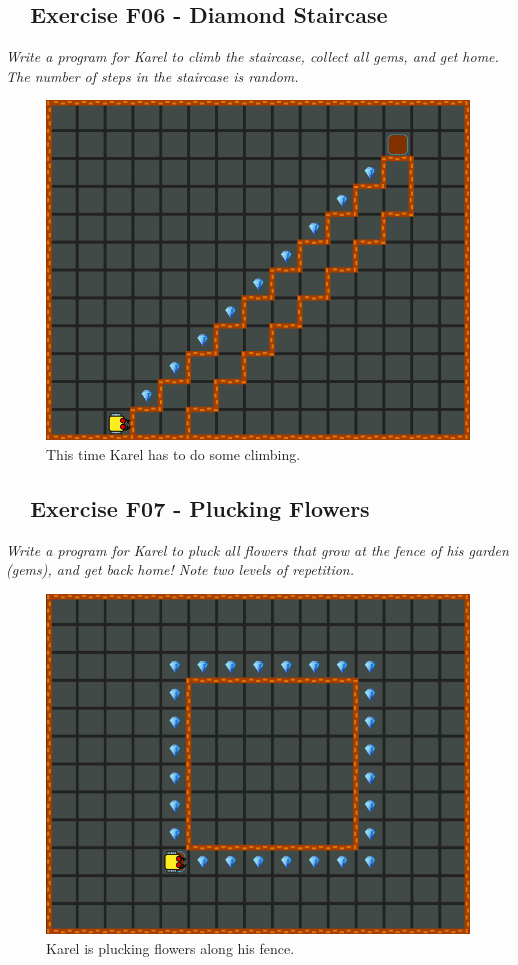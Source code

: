 {{{{\subsection{\ \ Exercise F06 - Diamond Staircase}

{\em Write a program for Karel to climb the staircase, collect all gems, and 
get home. The number of steps in the staircase is random. }


\begin{figure}[!ht]
\begin{center}
\includegraphics[height=0.4\textwidth]{imgk/f06.png}
\end{center}
\vspace{-4mm}
\caption{This time Karel has to do some climbing.}
\label{fig:f06}
\vspace{-10mm}
\end{figure}
\noindent
\newpage


\subsection{\ \ Exercise F07 - Plucking Flowers}

{\em Write a program for Karel to pluck all flowers that grow at the fence of his garden (gems), and get back home! Note two levels of repetition.}\\[-7mm]


\begin{figure}[!ht]
\begin{center}
\includegraphics[height=0.4\textwidth]{imgk/f07.png}
\end{center}
\vspace{-4mm}
\caption{Karel is plucking flowers along his fence.}
\label{fig:f07}
\vspace{-4mm}
\end{figure}
\noindent

}}}}
